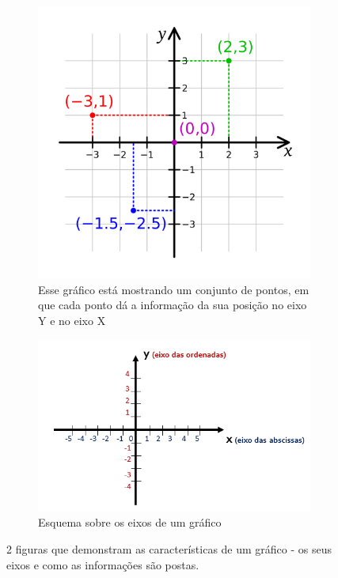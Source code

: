 \documentclass[12pt]{extarticle}
\newcommand{\<}{\langle}
\renewcommand{\>}{\rangle}
\theoremstyle{definition}
\begin{document}
\begin{figure}[H]
    \centering
    \begin{subfigure}[b]{0.4\textwidth}
         \centering
         \includegraphics[width=\textwidth]{2000px-Cartesian-coordinate-system.svg.png}
         \caption{Esse gráfico está mostrando um conjunto de pontos, em que cada ponto dá a informação da sua posição no eixo Y e no eixo X}
         \label{fig:graph_point}
     \end{subfigure}
     \hfill
     \begin{subfigure}[b]{0.4\textwidth}
         \centering
         \includegraphics[width=1\textwidth]{T3-eixo-das-abscissas-e-das-ordenadas-no-plano-cartesiano.png}
         \caption{Esquema sobre os eixos de um gráfico}
         \label{fig:eixos}
     \end{subfigure}
     \caption{2 figuras que demonstram as características de um gráfico - os seus eixos e como as informações são postas.}
     \label{fig:graph_basics}
\end{figure}
\end{document}
